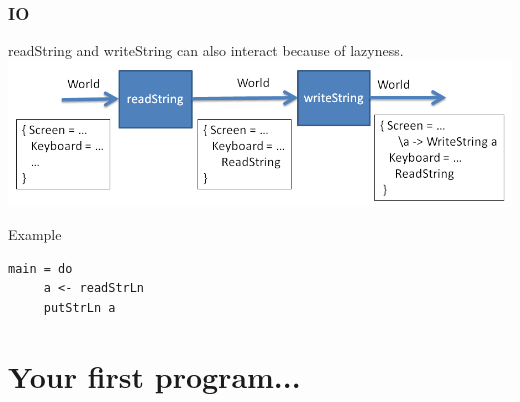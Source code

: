 \documentclass{beamer}
\begin{document}
\begin{frame}[fragile]
\frametitle{IO}
 readString and writeString can also interact because of lazyness.
 \vspace{0.5cm}
 \includegraphics[width=1\linewidth]{figs/pureReadWrite}
 \vspace{0.5cm}
 \begin{block}{Example}
  \begin{lstlisting}[basicstyle=\small]
   main = do
     a <- readStrLn
     putStrLn a
  \end{lstlisting}
 \end{block}
\end{frame}


%
%  
% 
%  
%
% 

\section{Your first program...}

\end{document}
